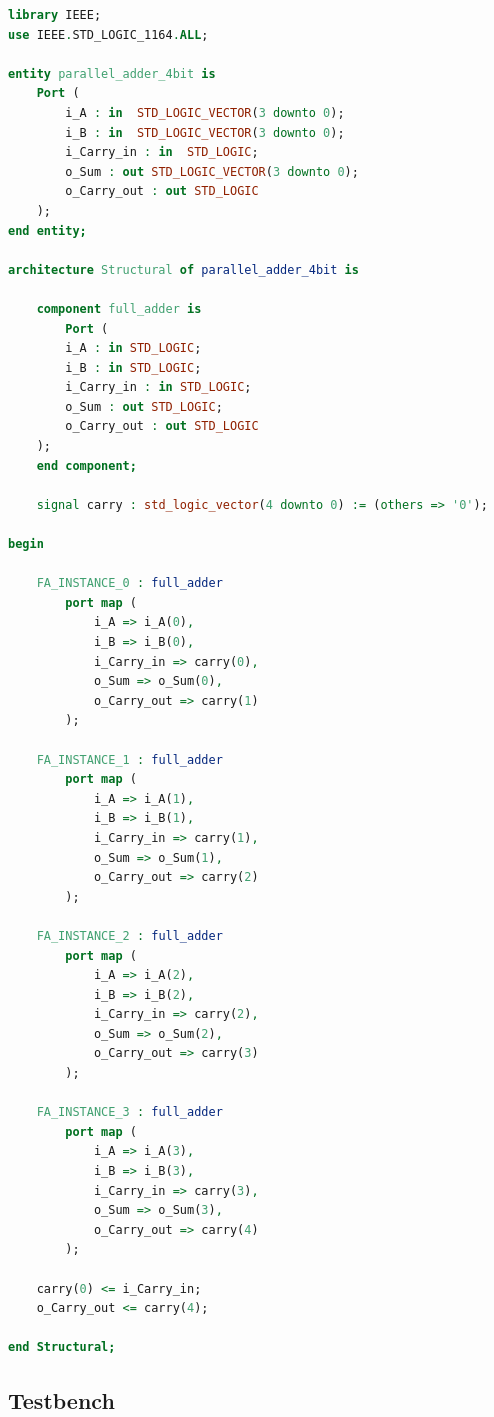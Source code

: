 \documentclass[12pt]{article}
\begin{document}
\begin{lstlisting}[language=VHDL]
library IEEE;
use IEEE.STD_LOGIC_1164.ALL;

entity parallel_adder_4bit is
    Port (
        i_A : in  STD_LOGIC_VECTOR(3 downto 0);
        i_B : in  STD_LOGIC_VECTOR(3 downto 0);
        i_Carry_in : in  STD_LOGIC;
        o_Sum : out STD_LOGIC_VECTOR(3 downto 0);
        o_Carry_out : out STD_LOGIC
    );
end entity;

architecture Structural of parallel_adder_4bit is

    component full_adder is
        Port (
        i_A : in STD_LOGIC;
        i_B : in STD_LOGIC;
        i_Carry_in : in STD_LOGIC;
        o_Sum : out STD_LOGIC;
        o_Carry_out : out STD_LOGIC
    );
    end component;

    signal carry : std_logic_vector(4 downto 0) := (others => '0');

begin

    FA_INSTANCE_0 : full_adder
        port map (
            i_A => i_A(0),
            i_B => i_B(0),
            i_Carry_in => carry(0),
            o_Sum => o_Sum(0),
            o_Carry_out => carry(1)
        );

    FA_INSTANCE_1 : full_adder
        port map (
            i_A => i_A(1),
            i_B => i_B(1),
            i_Carry_in => carry(1),
            o_Sum => o_Sum(1),
            o_Carry_out => carry(2)
        );

    FA_INSTANCE_2 : full_adder
        port map (
            i_A => i_A(2),
            i_B => i_B(2),
            i_Carry_in => carry(2),
            o_Sum => o_Sum(2),
            o_Carry_out => carry(3)
        );

    FA_INSTANCE_3 : full_adder
        port map (
            i_A => i_A(3),
            i_B => i_B(3),
            i_Carry_in => carry(3),
            o_Sum => o_Sum(3),
            o_Carry_out => carry(4)
        );

    carry(0) <= i_Carry_in;
    o_Carry_out <= carry(4);

end Structural;
\end{lstlisting}

\subsection*{Testbench}
\end{document}

